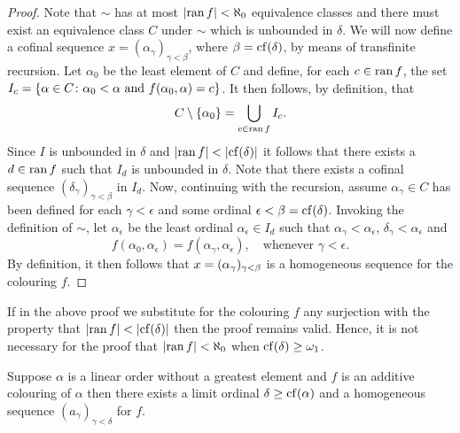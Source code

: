 \begin{proof}
	Note that $\sim$ has at most $\left\lvert\operatorname{ran} f\right\rvert<\aleph_0$ equivalence classes and there must exist an equivalence class $C$ under $\sim$ which is unbounded in $\delta$.  We will now define a cofinal sequence $x=(\alpha_{\gamma})_{\gamma<\beta}$, where $\beta=\operatorname{cf}(\delta)$, by means of transfinite recursion.  Let $\alpha_0$ be the least element of $C$ and define, for each $c\in\operatorname{ran} f$, the set $I_c=\left\lbrace \alpha\in C\colon \alpha_0<\alpha\text{ and }f(\alpha_0,\alpha)=c \right\rbrace$.  It then follows, by definition, that
	\begin{equation}
		C\setminus\left\lbrace \alpha_0\right\rbrace=\bigcup_{c\in\operatorname{ran} f}I_c.
	\end{equation}
	Since $I$ is unbounded in $\delta$ and $\left\lvert\operatorname{ran} f\right\rvert<\left\lvert\operatorname{cf}(\delta)\right\rvert$ it follows that there exists a $d\in\operatorname{ran} f$ such that $I_d$ is unbounded in $\delta$.  Note that there exists a cofinal sequence $(\delta_\gamma)_{\gamma<\beta}$ in $I_d$.  Now, continuing with the recursion, assume $\alpha_\gamma\in C$ has been defined for each $\gamma<\epsilon$ and some ordinal $\epsilon<\beta=\operatorname{cf}(\delta)$.  Invoking the definition of $\sim$, let $\alpha_\epsilon$ be the least ordinal $\alpha_\epsilon\in I_d$ such that $\alpha_\gamma<\alpha_\epsilon$, $\delta_\gamma<\alpha_\epsilon$ and
	\begin{equation}
		f(\alpha_0,\alpha_\epsilon)=f(\alpha_\gamma,\alpha_\epsilon),\quad\text{whenever }\gamma<\epsilon.
	\end{equation}
	By definition, it then follows that $x=(\alpha_\gamma)_{\gamma<\beta}$ is a homogeneous sequence for the colouring $f$.
\end{proof}

\begin{rem}
	If in the above proof we substitute for the colouring $f$ any surjection with the property that $\left\lvert\operatorname{ran} f\right\rvert<\left\lvert\operatorname{cf}(\delta)\right\rvert$ then the proof remains valid.  Hence, it is not necessary for the proof that $\left\lvert\operatorname{ran} f\right\rvert<\aleph_0$ when $\operatorname{cf}(\delta)\geq\omega_1$.
\end{rem}


\begin{cor}
	Suppose $\alpha$ is a linear order without a greatest element and $f$ is an additive colouring of $\alpha$ then there exists a limit ordinal $\delta\geq\operatorname{cf}(\alpha)$ and a homogeneous sequence $(a_\gamma)_{\gamma<\delta}$ for $f$.
\end{cor}

